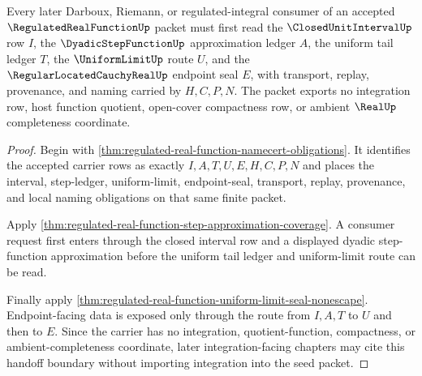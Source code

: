 \begin{theorem}
\label{thm:regulated-real-function-integration-facing-handoff-boundary}
Every later Darboux, Riemann, or regulated-integral consumer of an accepted $\RegulatedRealFunctionUp$ packet must first read the $\ClosedUnitIntervalUp$ row $I$, the $\DyadicStepFunctionUp$ approximation ledger $A$, the uniform tail ledger $T$, the $\UniformLimitUp$ route $U$, and the $\RegularLocatedCauchyRealUp$ endpoint seal $E$, with transport, replay, provenance, and naming carried by $H,C,P,N$. The packet exports no integration row, host function quotient, open-cover compactness row, or ambient $\RealUp$ completeness coordinate.
\end{theorem}
\begin{proof}
Begin with \autoref{thm:regulated-real-function-namecert-obligations}. It identifies the accepted carrier rows as exactly $I,A,T,U,E,H,C,P,N$ and places the interval, step-ledger, uniform-limit, endpoint-seal, transport, replay, provenance, and local naming obligations on that same finite packet.

Apply \autoref{thm:regulated-real-function-step-approximation-coverage}. A consumer request first enters through the closed interval row and a displayed dyadic step-function approximation before the uniform tail ledger and uniform-limit route can be read.

Finally apply \autoref{thm:regulated-real-function-uniform-limit-seal-nonescape}. Endpoint-facing data is exposed only through the route from $I,A,T$ to $U$ and then to $E$. Since the carrier has no integration, quotient-function, compactness, or ambient-completeness coordinate, later integration-facing chapters may cite this handoff boundary without importing integration into the seed packet.
\end{proof}

